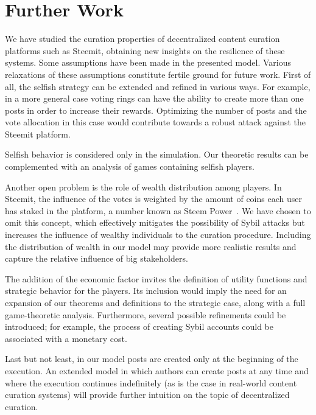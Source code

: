 \section{Further Work}

  We have studied the curation properties of decentralized content curation
  platforms such as Steemit, obtaining new insights on the resilience of these
  systems. Some assumptions have been made in the presented model. Various
  relaxations of these assumptions constitute fertile ground for future work.
  First of all, the selfish strategy can be extended and refined in various
  ways. For example, in a more general case voting rings can have the ability to
  create more than one posts in order to increase their rewards. Optimizing the
  number of posts and the vote allocation in this case would contribute towards
  a robust attack against the Steemit platform.

  Selfish behavior is considered only in the simulation. Our theoretic results
  can be complemented with an analysis of games containing selfish players.

  Another open problem is the role of wealth distribution among players. In
  Steemit, the influence of the votes is weighted by the amount of coins each
  user has staked in the platform, a number known as Steem Power~\cite{steemit}.
  We have chosen to omit this concept, which effectively mitigates the
  possibility of Sybil attacks but increases the influence of wealthy
  individuals to the curation procedure. Including the distribution of wealth in
  our model may provide more realistic results and capture the relative
  influence of big stakeholders.

  The addition of the economic factor invites the definition of utility
  functions and strategic behavior for the players. Its inclusion would imply
  the need for an expansion of our theorems and definitions to the strategic
  case, along with a full game-theoretic analysis. Furthermore, several possible
  refinements could be introduced; for example, the process of creating Sybil
  accounts could be associated with a monetary cost.

  Last but not least, in our model posts are created only at the beginning of
  the execution. An extended model in which authors can create posts at any time
  and where the execution continues indefinitely (as is the case in real-world
  content curation systems) will provide further intuition on the topic of
  decentralized curation.
